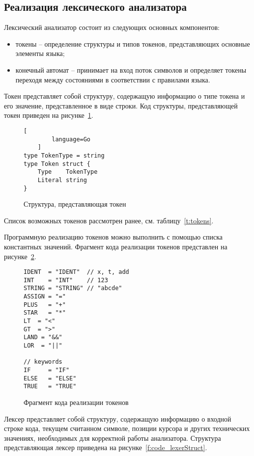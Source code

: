 \subsection{Реализация лексического анализатора}

Лексический анализатор состоит из следующих основных компонентов:
\begin{itemize}
    \item токены -- определение структуры и типов токенов, представляющих основные элементы языка;
    \item конечный автомат -- принимает на вход поток символов и определяет токены переходя между состояниями в соответствии с правилами языка.
\end{itemize}

Токен представляет собой структуру, содержащую информацию о типе токена и его значение, представленное в виде строки.
Код структуры, представляющей токен приведен на рисунке~\ref{f:code_tokenStruct}.

\begin{figure}[ht]
	\centering
	\vspace{\toppaddingoffigure}
	\begin{lstlisting}[
        language=Go
    ]
type TokenType = string
type Token struct {
    Type    TokenType
    Literal string
}        
\end{lstlisting}
	\caption{Структура, представляющая токен}
	\label{f:code_tokenStruct}
\end{figure}

Список возможных токенов рассмотрен ранее, см. таблицу~\ref{t:tokens}.

Программную реализацию токенов можно выполнить с помощью списка константных значений.
Фрагмент кода реализации токенов представлен на рисунке~\ref{f:code_tokensFragemnt}.

\begin{figure}[ht]
	\centering
	\begin{lstlisting}
IDENT  = "IDENT"  // x, t, add
INT    = "INT"    // 123
STRING = "STRING" // "abcde"
ASSIGN = "="
PLUS   = "+"
STAR   = "*"
LT  = "<"
GT  = ">"
LAND = "&&"
LOR  = "||"

// keywords
IF     = "IF"
ELSE   = "ELSE"
TRUE   = "TRUE"    
\end{lstlisting}
	\caption{Фрагмент кода реализации токенов}
	\label{f:code_tokensFragemnt}
\end{figure}

Лексер представляет собой структуру, содержащую информацию о входной строке кода,
текущем считанном символе, позиции курсора и других технических значениях, необходимых для корректной работы анализатора.
Структура представляющая лексер приведена на рисунке~\ref{f:code_lexerStruct}.

